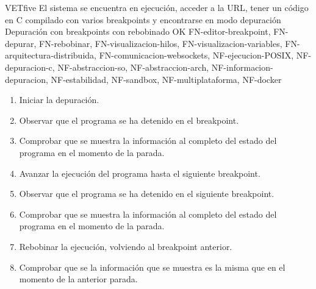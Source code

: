     \begin{testCase}{VET}{five}
        {El sistema se encuentra en ejecución, acceder a la URL, tener un código en C compilado con varios breakpoints y encontrarse en modo depuración}
        {\NA}
        {Depuración con breakpoints con rebobinado}
        {OK}
        {FN-editor-breakpoint, FN-depurar, FN-rebobinar, FN-visualizacion-hilos, FN-visualizacion-variables, FN-arquitectura-distribuida, FN-comunicacion-websockets, NF-ejecucion-POSIX, NF-depuracion-c, NF-abstraccion-so, NF-abstraccion-arch, NF-informacion-depuracion, NF-estabilidad, NF-sandbox, NF-multiplataforma, NF-docker}
        \begin{enumerate}
            \item Iniciar la depuración.
            \item Observar que el programa se ha detenido en el breakpoint.
            \item Comprobar que se muestra la información al completo del estado del programa en el momento de la parada.
            \item Avanzar la ejecución del programa hasta el siguiente breakpoint.
            \item Observar que el programa se ha detenido en el siguiente breakpoint.
            \item Comprobar que se muestra la información al completo del estado del programa en el momento de la parada.
            \item Rebobinar la ejecución, volviendo al breakpoint anterior.
            \item Comprobar que se la información que se muestra es la misma que en el momento de la anterior parada.
        \end{enumerate}
    \end{testCase}


